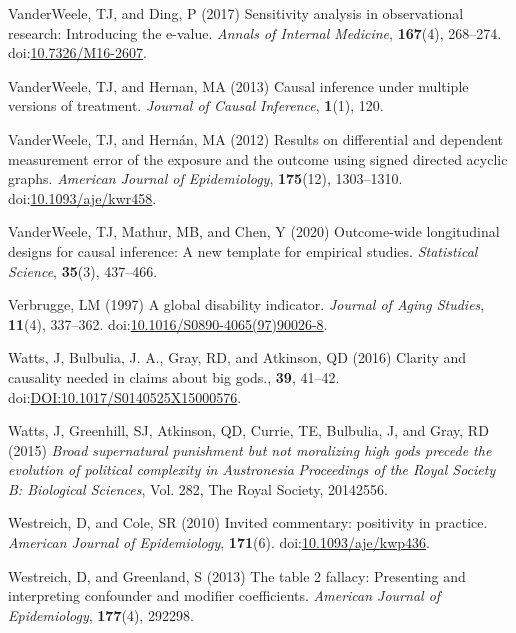 \documentclass[
  single column]{article}
\newlength{\cslhangindent}
\newenvironment{CSLReferences}[2] %
 {\begin{list}{}{%
  \setlength{\itemindent}{0pt}
  \setlength{\leftmargin}{0pt}
  \setlength{\parsep}{0pt}
  \ifodd #1
   \setlength{\leftmargin}{\cslhangindent}
   \setlength{\itemindent}{-1\cslhangindent}
  \fi
  \setlength{\itemsep}{#2\baselineskip}}}
 {\end{list}}
\begin{document}
\begin{CSLReferences}{1}{0}
VanderWeele, TJ, and Ding, P (2017) Sensitivity analysis in
observational research: Introducing the e-value. \emph{Annals of
Internal Medicine}, \textbf{167}(4), 268--274.
doi:\href{https://doi.org/10.7326/M16-2607}{10.7326/M16-2607}.

VanderWeele, TJ, and Hernan, MA (2013) Causal inference under multiple
versions of treatment. \emph{Journal of Causal Inference},
\textbf{1}(1), 120.

VanderWeele, TJ, and Hernán, MA (2012) Results on differential and
dependent measurement error of the exposure and the outcome using signed
directed acyclic graphs. \emph{American Journal of Epidemiology},
\textbf{175}(12), 1303--1310.
doi:\href{https://doi.org/10.1093/aje/kwr458}{10.1093/aje/kwr458}.

VanderWeele, TJ, Mathur, MB, and Chen, Y (2020) Outcome-wide
longitudinal designs for causal inference: A new template for empirical
studies. \emph{Statistical Science}, \textbf{35}(3), 437--466.

Verbrugge, LM (1997) A global disability indicator. \emph{Journal of
Aging Studies}, \textbf{11}(4), 337--362.
doi:\href{https://doi.org/10.1016/S0890-4065(97)90026-8}{10.1016/S0890-4065(97)90026-8}.

Watts, J, Bulbulia, J. A., Gray, RD, and Atkinson, QD (2016) Clarity and
causality needed in claims about big gods., \textbf{39}, 41--42.
doi:\href{https://doi.org/DOI:10.1017/S0140525X15000576}{DOI:10.1017/S0140525X15000576}.

Watts, J, Greenhill, SJ, Atkinson, QD, Currie, TE, Bulbulia, J, and
Gray, RD (2015) \emph{Broad supernatural punishment but not moralizing
high gods precede the evolution of political complexity in
{A}ustronesia} \emph{Proceedings of the Royal Society B: Biological
Sciences}, Vol. 282, The Royal Society, 20142556.

Westreich, D, and Cole, SR (2010) Invited commentary: positivity in
practice. \emph{American Journal of Epidemiology}, \textbf{171}(6).
doi:\href{https://doi.org/10.1093/aje/kwp436}{10.1093/aje/kwp436}.

Westreich, D, and Greenland, S (2013) The table 2 fallacy: Presenting
and interpreting confounder and modifier coefficients. \emph{American
Journal of Epidemiology}, \textbf{177}(4), 292298.


\end{CSLReferences}
\end{document}
